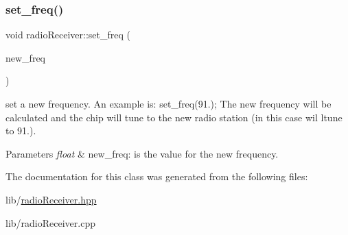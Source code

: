 \subsubsection{\texorpdfstring{set\+\_\+freq()}{set\_freq()}}
{\footnotesize\ttfamily void radio\+Receiver\+::set\+\_\+freq (\begin{DoxyParamCaption}\item[{float}]{new\+\_\+freq }\end{DoxyParamCaption})}



set a new frequency. An example is\+: set\+\_\+freq(91.); The new frequency will be calculated and the chip will tune to the new radio station (in this case wil ltune to 91.). 


\begin{DoxyParams}{Parameters}
{\em float} & new\+\_\+freq\+: is the value for the new frequency. \\
\hline
\end{DoxyParams}


The documentation for this class was generated from the following files\+:\begin{DoxyCompactItemize}
\item 
lib/\hyperlink{radio_receiver_8hpp}{radio\+Receiver.\+hpp}\item 
lib/radio\+Receiver.\+cpp\end{DoxyCompactItemize}
